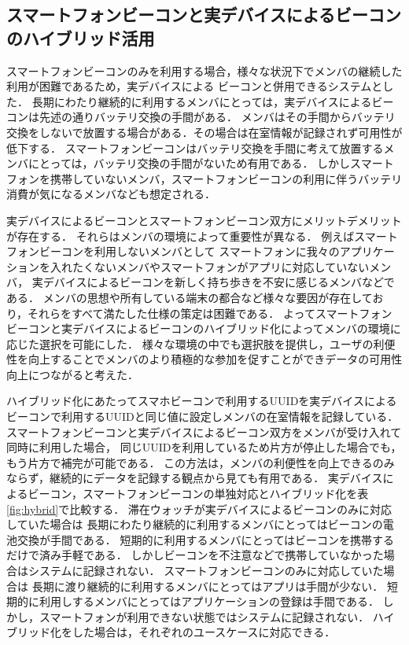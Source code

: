 \subsection{スマートフォンビーコンと実デバイスによるビーコンのハイブリッド活用}
スマートフォンビーコンのみを利用する場合，様々な状況下でメンバの継続した利用が困難であるため，実デバイスによる
ビーコンと併用できるシステムとした．
長期にわたり継続的に利用するメンバにとっては，実デバイスによるビーコンは先述の通りバッテリ交換の手間がある．
メンバはその手間からバッテリ交換をしないで放置する場合がある．その場合は在室情報が記録されず可用性が低下する．
スマートフォンビーコンはバッテリ交換を手間に考えて放置するメンバにとっては，バッテリ交換の手間がないため有用である．
しかしスマートフォンを携帯していないメンバ，スマートフォンビーコンの利用に伴うバッテリ消費が気になるメンバなども想定される．

実デバイスによるビーコンとスマートフォンビーコン双方にメリットデメリットが存在する．
それらはメンバの環境によって重要性が異なる．
例えばスマートフォンビーコンを利用しないメンバとして
スマートフォンに我々のアプリケーションを入れたくないメンバやスマートフォンがアプリに対応していないメンバ，
実デバイスによるビーコンを新しく持ち歩きを不安に感じるメンバなどである．
メンバの思想や所有している端末の都合など様々な要因が存在しており，それらをすべて満たした仕様の策定は困難である．
よってスマートフォンビーコンと実デバイスによるビーコンのハイブリッド化によってメンバの環境に応じた選択を可能にした．
様々な環境の中でも選択肢を提供し，ユーザの利便性を向上することでメンバのより積極的な参加を促すことができデータの可用性向上につながると考えた．

ハイブリッド化にあたってスマホビーコンで利用するUUIDを実デバイスによるビーコンで利用するUUIDと同じ値に設定しメンバの在室情報を記録している．
スマートフォンビーコンと実デバイスによるビーコン双方をメンバが受け入れて同時に利用した場合，
同じUUIDを利用しているため片方が停止した場合でも，もう片方で補完が可能である．
この方法は，メンバの利便性を向上できるのみならず，継続的にデータを記録する観点から見ても有用である．
実デバイスによるビーコン，スマートフォンビーコンの単独対応とハイブリッド化を表\ref{fig:hybrid}で比較する．
 滞在ウォッチが実デバイスによるビーコンのみに対応していた場合は
長期にわたり継続的に利用するメンバにとってはビーコンの電池交換が手間である．
短期的に利用するメンバにとってはビーコンを携帯するだけで済み手軽である．
しかしビーコンを不注意などで携帯していなかった場合はシステムに記録されない．
スマートフォンビーコンのみに対応していた場合は
長期に渡り継続的に利用するメンバにとってはアプリは手間が少ない．
短期的に利用しするメンバにとってはアプリケーションの登録は手間である．
しかし，スマートフォンが利用できない状態ではシステムに記録されない．
ハイブリッド化をした場合は，それぞれのユースケースに対応できる．

